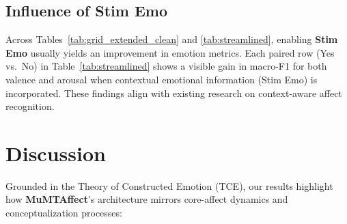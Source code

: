 \documentclass[sigconf]{acmart}
\begin{document}
\subsection{Influence of Stim Emo}

Across Tables~\ref{tab:grid_extended_clean} and \ref{tab:streamlined}, enabling \textbf{Stim Emo} usually yields an improvement in emotion metrics. Each paired row (Yes vs.\ No) in Table~\ref{tab:streamlined} shows a visible gain in macro-F1 for both valence and arousal when contextual emotional information (Stim Emo) is incorporated. These findings align with existing research on context-aware affect recognition.

\section{Discussion}

Grounded in the Theory of Constructed Emotion (TCE), our results highlight how \textbf{MuMTAffect}'s architecture mirrors core-affect dynamics and conceptualization processes:
\end{document}
